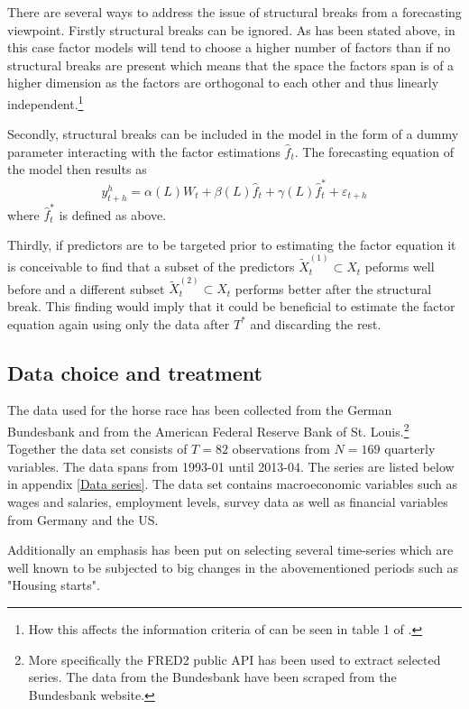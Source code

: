 \documentclass[12pt]{article}
\begin{document}
There are several ways to address the issue of structural breaks from a forecasting viewpoint. Firstly structural breaks can be ignored. As has been stated above, in this case factor models will tend to choose a higher number of factors than if no structural breaks are present which means that the space the factors span is of a higher dimension as the factors are orthogonal to each other and thus linearly independent.\footnote{How this affects the information criteria of \citet{bai2002determining} can be seen in table 1 of \citet{breitung2011testing}.}

Secondly, structural breaks can be included in the model in the form of a dummy parameter interacting with the factor estimations $\hat f_t$. The forecasting equation of the model then results as
\begin{equation}
	\label{forecasting, structural breaks}
	y^h_{t+h} = \alpha(L) W_t + \beta(L) \hat f_t + \gamma(L) \hat f_t^* + \varepsilon_{t+h}
\end{equation}
where $\hat f_t^*$ is defined as above.

Thirdly, if predictors are to be targeted prior to estimating the factor equation it is conceivable to find that a subset of the predictors $\tilde X_t^{(1)} \subset X_t$ peforms well before and a different subset $\tilde X_t^{(2)} \subset X_t$ performs better after the structural break. This finding would imply that it could be beneficial to estimate the factor equation again using only the data after $T^*$ and discarding the rest.


\subsection{Data choice and treatment}
The data used for the horse race has been collected from the German Bundesbank and from the American Federal Reserve Bank of St. Louis.\footnote{More specifically the FRED2 public API has been used to extract selected series. The data from the Bundesbank have been scraped from the Bundesbank website.}  Together the data set consists of $T=82$ observations from $N=169$ quarterly variables. The data spans from 1993-01 until 2013-04. The series are listed below in appendix \ref{Data series}. The data set contains macroeconomic variables such as wages and salaries, employment levels, survey data as well as financial variables from Germany and the US.

Additionally an emphasis has been put on selecting several time-series which are well known to be subjected to big changes in the abovementioned periods such as "Housing starts".
\end{document}
